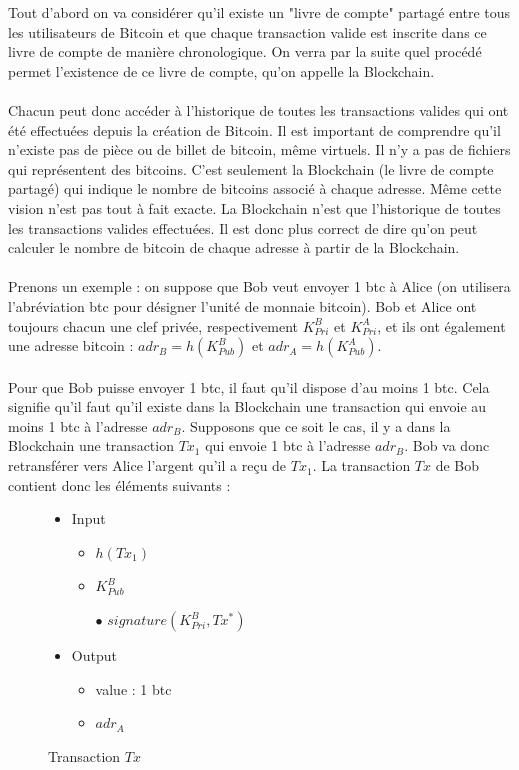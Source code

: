 \documentclass[11pt,a4paper]{article}
\begin{document}
Tout d'abord on va considérer qu'il existe un "livre de compte" partagé entre tous les utilisateurs de Bitcoin et que chaque transaction valide est inscrite dans ce livre de compte de manière chronologique. On verra par la suite quel procédé permet l'existence de ce livre de compte, qu'on appelle la Blockchain.\\\\
Chacun peut donc accéder à l'historique de toutes les transactions valides qui ont été effectuées depuis la création de Bitcoin. Il est important de comprendre qu'il n'existe pas de pièce ou de billet de bitcoin, même virtuels. Il n'y a pas de fichiers qui représentent des bitcoins. C'est seulement la Blockchain (le livre de compte partagé) qui indique le nombre de bitcoins associé à chaque adresse.  Même cette vision n'est pas tout à fait exacte. La Blockchain n'est que l'historique de toutes les transactions valides effectuées. Il est donc plus correct de dire qu'on peut calculer le nombre de bitcoin de chaque adresse à partir de la Blockchain.\\\\
Prenons un exemple : on suppose que Bob veut envoyer 1 btc à Alice (on utilisera l'abréviation btc pour désigner l'unité de monnaie bitcoin). Bob et Alice ont toujours chacun une clef privée, respectivement $K_{Pri}^{B}$ et $K_{Pri}^{A}$, et ils ont également une adresse bitcoin : $adr_B = h(K_{Pub}^{B})$ et $adr_A = h(K_{Pub}^{A})$.\\\\
Pour que Bob puisse envoyer 1 btc, il faut qu'il dispose d'au moins 1 btc. Cela signifie qu'il faut qu'il existe dans la Blockchain une transaction qui envoie au moins 1 btc à l'adresse $adr_B$. Supposons que ce soit le cas, il y a dans la Blockchain une transaction $Tx_1$ qui envoie 1 btc à l'adresse  $adr_B$. Bob va donc retransférer vers Alice l'argent qu'il a reçu de $Tx_1$.
La transaction $Tx$ de Bob contient donc les éléments suivants :\\


\begin{figure}[H]
\begin{itemize}
\renewcommand{\labelitemi}{$\bullet$}
\renewcommand{\labelitemii}{$\star$}

\item Input
\begin{itemize}
\item $h(Tx_1)$
\item $K_{Pub}^{B}$
\item[$\bullet$] $signature(K_{Pri}^{B}, Tx^*)$
\end{itemize}

\item Output
\begin{itemize}
\item value : 1 btc
\item $adr_A$
\end{itemize}

\end{itemize}

\caption{Transaction $Tx$}
\end{figure}
\end{document}
